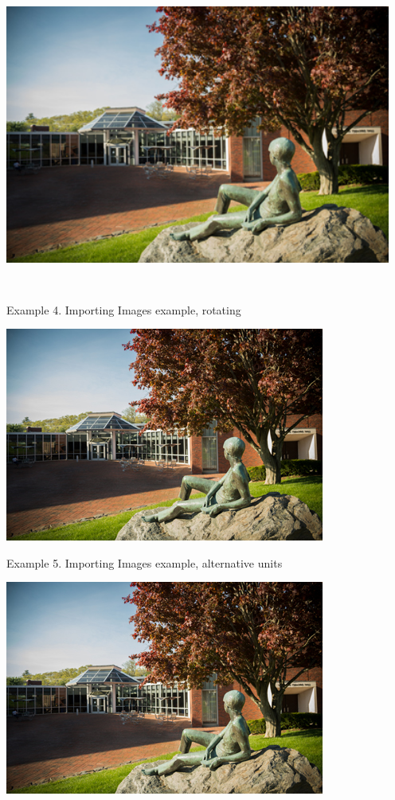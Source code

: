 \documentclass{article}
\begin{document}
\includegraphics[width=5in, height=4in]{library}

\newpage


Example 4. Importing Images example, rotating

\includegraphics[scale=.3, angle=45]{library}


Example 5. Importing Images example, alternative units

\vspace{1.5cm}

\includegraphics[width=\textwidth]{library}
\end{document}
